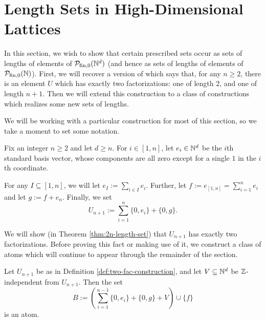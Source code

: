 \section{Length Sets in High-Dimensional Lattices}
In this section, we wish to show that certain prescribed sets occur as sets of lengths of elements of $\mathcal{P}_{\textrm{fin}, 0}(\mathbb{N}^d)$ (and hence as sets of lengths of elements of ${\mathcal{P}_{\textrm{fin},0}(\mathbb{N})}$).
First, we will recover a version of \cite[Proposition 4.10]{fan-tringali18} which says that, for any $n\ge 2$, there is an element $U$ which has exactly two factorizations: one of length $2$, and one of length $n+1$.
Then we will extend this construction to a class of constructions which realizes some new sets of lengths.

We will be working with a particular construction for most of this section, so we take a moment to set some notation.

\begin{defn} \label{def:two-fac-construction}
Fix an integer $n\ge 2$ and let $d\ge n$.
For $i\in [ 1,n]$, let $e_i \in \mathbb{N}^d$ be the $i$th standard basis vector, whose components are all zero except for a single $1$ in the $i$th coordinate.

For any $I \subseteq [ 1,n ]$, we will let $e_I := \sum_{i\in I} e_i$.
Further, let $f := e_{[ 1,n ]} = \sum_{i=1}^n e_i$ and let $g := f + e_n$.
Finally, we set
\[U_{n+1} := \sum_{i=1}^n \{0,e_i\} + \{0,g\}.\]
\end{defn}

We will show (in Theorem \ref{thm:2n-length-set}) that $U_{n+1}$ has exactly two factorizations. 
Before proving this fact or making use of it, we construct a class of atoms which will continue to appear through the remainder of the section.

\begin{lemma} \label{lem:large-atom-two-fac}
Let $U_{n+1}$ be as in Definition \ref{def:two-fac-construction}, and let $V\subseteq \mathbb{N}^d$ be $\mathbb{Z}$-independent from $U_{n+1}$.
Then the set
\[ B:= \left( \sum_{i=1}^{n-1} \{0,e_i\} + \{0,g\} + V \right) \cup \{f\} \]
is an atom.
\end{lemma}

